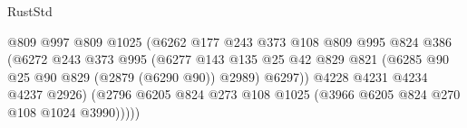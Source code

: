 \begin{lexlean}{RustStd}
\begin{coremodule}
                                                  @809
                                                  @997
                                                  @809
                                                  @1025
                                                  (@6262
                                                    @177
                                                    @243
                                                    @373
                                                    @108
                                                    @809
                                                    @995
                                                    @824
                                                    @386
                                                    (@6272
                                                      @243
                                                      @373
                                                      @995
                                                      (@6277
                                                        @143
                                                        @135
                                                        @25
                                                        @42
                                                        @829
                                                        @821
                                                        (@6285
                                                          @90
                                                          @25
                                                          @90
                                                          @829
                                                          (@2879 (@6290 @90))
                                                          @2989)
                                                        @6297))
                                                    @4228
                                                    @4231
                                                    @4234
                                                    @4237
                                                    @2926)
                                                  (@2796
                                                    @6205
                                                    @824
                                                    @273
                                                    @108
                                                    @1025
                                                    (@3966 @6205 @824 @270 @108 @1024 @3990)))))

\end{coremodule}
\end{lexlean}
